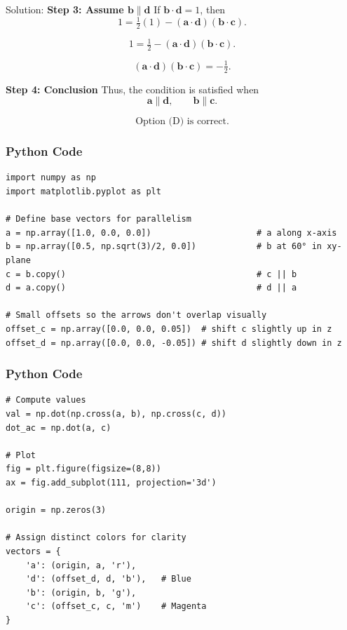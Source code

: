 \documentclass{beamer}
\begin{document}
\begin{frame}{Solution:}
\textbf{Step 3: Assume $\mathbf{b} \parallel \mathbf{d}$}
If $\mathbf{b} \cdot \mathbf{d} = 1$, then
\begin{equation}
1 = \tfrac12 (1) - (\mathbf{a} \cdot \mathbf{d})(\mathbf{b} \cdot \mathbf{c}).
\end{equation}

\begin{equation}
1 = \tfrac12 - (\mathbf{a} \cdot \mathbf{d})(\mathbf{b} \cdot \mathbf{c}).
\end{equation}

\begin{equation}
(\mathbf{a} \cdot \mathbf{d})(\mathbf{b} \cdot \mathbf{c}) = -\tfrac12.
\end{equation}

\textbf{Step 4: Conclusion}
Thus, the condition is satisfied when
\begin{equation}
\mathbf{a} \parallel \mathbf{d}, 
\qquad 
\mathbf{b} \parallel \mathbf{c}.
\end{equation}

\[
\boxed{\text{Option (D) is correct.}}
\]
\end{frame}

\begin{frame}[fragile]
    \frametitle{Python Code}
    \begin{lstlisting}
import numpy as np
import matplotlib.pyplot as plt

# Define base vectors for parallelism
a = np.array([1.0, 0.0, 0.0])                     # a along x-axis
b = np.array([0.5, np.sqrt(3)/2, 0.0])            # b at 60° in xy-plane
c = b.copy()                                      # c || b
d = a.copy()                                      # d || a

# Small offsets so the arrows don't overlap visually
offset_c = np.array([0.0, 0.0, 0.05])  # shift c slightly up in z
offset_d = np.array([0.0, 0.0, -0.05]) # shift d slightly down in z
\end{lstlisting}
\end{frame}

\begin{frame}[fragile]
    \frametitle{Python Code}
    \begin{lstlisting}
# Compute values
val = np.dot(np.cross(a, b), np.cross(c, d))
dot_ac = np.dot(a, c)

# Plot
fig = plt.figure(figsize=(8,8))
ax = fig.add_subplot(111, projection='3d')

origin = np.zeros(3)

# Assign distinct colors for clarity
vectors = {
    'a': (origin, a, 'r'),
    'd': (offset_d, d, 'b'),   # Blue
    'b': (origin, b, 'g'),
    'c': (offset_c, c, 'm')    # Magenta
}
\end{lstlisting}
\end{frame}
\end{document}
